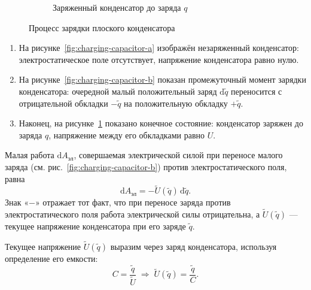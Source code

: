 \documentclass[14pt,a4paper,oneside]{extreport}
\theoremstyle{definition}
\begin{document}
\begin{figure}[H]
\begin{subfigure}[t]{0.28\textwidth}
{%
    }
    \caption{Заряженный конденсатор до заряда $q$}
    \label{fig:charging-capacitor-c}
  \end{subfigure}

  \caption{Процесс зарядки плоского конденсатора}
  \label{fig:charging-capacitor}
\end{figure}

\begin{enumerate}
  \item На рисунке~\ref{fig:charging-capacitor-a} изображён незаряженный конденсатор:
электростатическое поле отсутствует, напряжение конденсатора равно нулю.
\item На рисунке~\ref{fig:charging-capacitor-b} показан промежуточный момент
зарядки конденсатора: очередной малый положительный заряд $\mathrm{d}\tilde q$ переносится с отрицательной обкладки $-\tilde q$ на положительную обкладку $+\tilde q$. 
\item Наконец, на рисунке~\ref{fig:charging-capacitor-c} показано
конечное состояние: конденсатор заряжен до заряда $q$,
напряжение между его обкладками равно $U$. 
\end{enumerate}

Малая работа $\mathrm{d}A_{\text{эл}}$, совершаемая электрической силой
при переносе малого заряда (см. рис.~\ref{fig:charging-capacitor-b})
против электростатического поля, равна
\begin{equation}
\mathrm{d}A_{\text{эл}} = - \tilde U(\tilde q)\,\mathrm{d}\tilde q.
\label{eq:work}
\end{equation}
Знак «$-$» отражает тот факт, что при переносе заряда против
электростатического поля работа электрической силы отрицательна,
а $\tilde U(\tilde q)$ — текущее напряжение конденсатора
при его заряде $\tilde q$.

Текущее напряжение $\tilde U(\tilde q)$ выразим через заряд конденсатора,
используя определение его емкости:
\begin{equation}
  C = \frac{\tilde q}{\tilde U}
  \;\Rightarrow\;
  \tilde U(\tilde q) = \frac{\tilde q}{C}.
  \label{eq:napr-2}
\end{equation}
\end{document}

